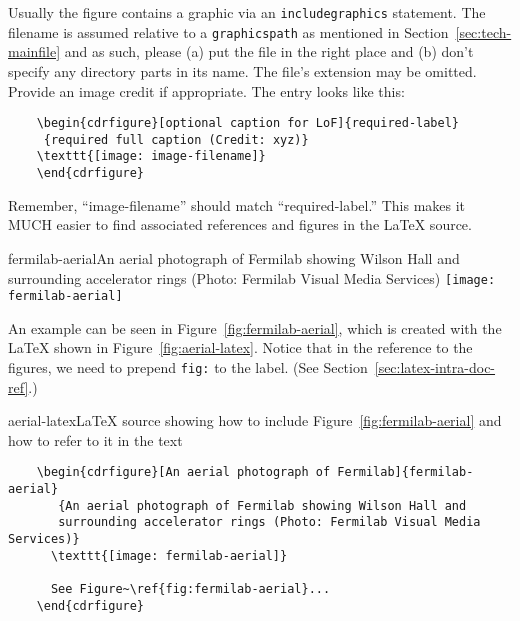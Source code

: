 Usually the figure contains a graphic via an \texttt{includegraphics} statement.
The filename is assumed relative to a \texttt{graphicspath} as
mentioned in Section~\ref{sec:tech-mainfile} and as such, please (a) put the file in the right place and (b) don't
 specify any directory parts in its name.
The file's extension may be omitted. Provide an image credit if appropriate. The entry looks like this:

\begin{verbatim}
    \begin{cdrfigure}[optional caption for LoF]{required-label}
     {required full caption (Credit: xyz)}
    \texttt{[image: image-filename]}
    \end{cdrfigure}
\end{verbatim}

Remember, ``image-filename'' should match ``required-label.'' This makes it MUCH easier to find associated references and figures in the \LaTeX{}  source. 

\begin{cdrfigure}{fermilab-aerial}{An aerial photograph of Fermilab
    showing Wilson Hall and surrounding accelerator rings (Photo: Fermilab
    Visual Media Services)}
  \texttt{[image: fermilab-aerial]}
\end{cdrfigure}


An example can be seen in Figure~\ref{fig:fermilab-aerial}, which is created
with the \LaTeX{} shown in Figure~\ref{fig:aerial-latex}.  Notice that in the reference to the figures, we need to prepend \texttt{fig:} to the label. (See Section~\ref{sec:latex-intra-doc-ref}.)

\begin{cdrfigure}[]{aerial-latex}{\LaTeX{} source showing how to include Figure~\ref{fig:fermilab-aerial} and how to refer to it in the text}
\begin{verbatim}
    \begin{cdrfigure}[An aerial photograph of Fermilab]{fermilab-aerial}
       {An aerial photograph of Fermilab showing Wilson Hall and 
       surrounding accelerator rings (Photo: Fermilab Visual Media Services)}
      \texttt{[image: fermilab-aerial]}
      
      See Figure~\ref{fig:fermilab-aerial}...
    \end{cdrfigure}
\end{verbatim}
\end{cdrfigure}

